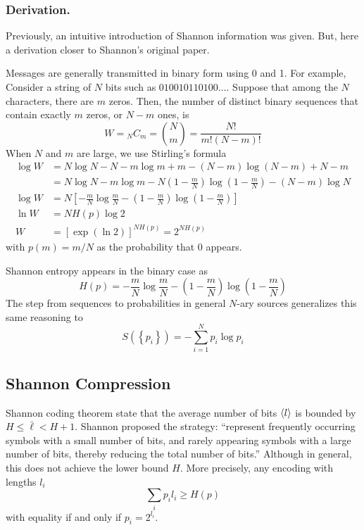 \documentclass[../../../main.tex]{subfiles}
\begin{document}
\subsubsection{Derivation.}
Previously, an intuitive introduction of Shannon information was given.
But, here a derivation closer to Shannon’s original paper.

Messages are generally transmitted in binary form using 0 and 1. For example,
Consider a string of $N$ bits such as $010010110100\ldots$.
Suppose that among the $N$ characters, there are $m$ zeros.
Then, the number of distinct binary sequences that contain exactly $m$ zeros, or $N-m$ ones, is
\begin{equation*}
  W = {}_N C_m = \binom{N}{m} = \frac{N!}{m!(N-m)!}
\end{equation*}
When $N$ and $m$ are large, we use Stirling’s formula
\begin{align*}
  \log W & = N \log N - N - m \log m + m - (N - m)\log (N - m) + N - m                                                      \\
         & = N \log N - m \log m - N\left(1 - \frac{m}{N}\right)\log \left(1 - \frac{m}{N}\right) - (N - m)\log N           \\
  \log W
         & = N \left[ -\frac{m}{N} \log \frac{m}{N} - \left(1 - \frac{m}{N}\right)\log \left(1 - \frac{m}{N}\right) \right] \\
  \ln W
         & =N H(p) \log 2                                                                                                   \\
  W      & = [\exp (\ln 2) ]^{N H(p) } = 2 ^{N H(p) }
\end{align*}
with $p(m)=m/N$ as the probability that 0 appears.

Shannon entropy appears in the binary case as
\begin{equation*}
  H(p)
  =  -\frac{m}{N} \log \frac{m}{N} - \left(1 - \frac{m}{N}\right)\log \left(1 - \frac{m}{N}\right)
\end{equation*}
The step from sequences to probabilities in general $N$-ary sources generalizes this same reasoning to
\begin{equation*}
  S(\left\{ p_i \right\} ) = -\sum_{i=1}^{N} p_i \log p_i
\end{equation*}

\subsection{Shannon Compression}
Shannon coding theorem state that the average number of bits $\braket{l }$ is bounded by $H \le \bar{\ell} < H + 1$.
Shannon proposed the strategy: “represent frequently occurring symbols with a small number of bits, and rarely appearing symbols with a large number of bits, thereby reducing the total number of bits.”
Although in general, this does not achieve the lower bound $H$.
More precisely, any encoding with lengths $l_i$
\begin{equation*}
  \sum_i p_i l_i \ge H(p)
\end{equation*}
with equality if and only if $p_i = 2^{l_i}$.
\end{document}
